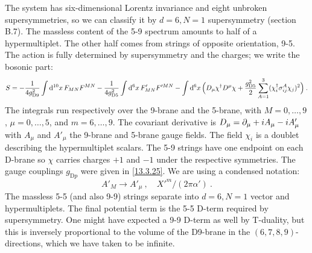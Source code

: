 The system has six-dimensional Lorentz invariance and eight unbroken supersymmetries, so we can classify it by $d = 6, N = 1$ supersymmetry (section B.7). The massless content of the 5-9 spectrum amounts to half of a hypermultiplet. The other half comes from strings of opposite orientation, 9-5. The action is fully determined by supersymmetry and the charges; we write the bosonic part:
\begin{equation}
	S = -\frac{1}{4g_{\mathrm{D}9}^2}\int \mathrm{d}^{10}x\,F_{MN}F^{MN} - \frac{1}{4g_{\mathrm{D}5}^2}\int \mathrm{d}^6 x\,F'_{MN}F'^{MN} - \int \mathrm{d}^6 x\,\Bigl(D_\mu\chi^\dagger D^\mu\chi + \frac{g_{\mathrm{D}5}^2}{2}\sum_{A=1}^3(\chi_i^\dagger\sigma_{ij}^A\chi_j)^2\Bigr) \:. \label{13.5.21}
\end{equation}
The integrals run respectively over the 9-brane and the 5-brane, with $M = 0,\dots,9$, $\mu = 0,\dots,5$, and $m = 6,\dots,9$. The covariant derivative is $D_\mu = \partial_\mu + i A_\mu - i A'_\mu$ with $A_\mu$ and $A'_\mu$ the 9-brane and 5-brane gauge fields. The field $\chi_i$ is a doublet describing the hypermultiplet scalars. The 5-9 strings have one endpoint on each D-brane so $\chi$ carries charges $+1$ and $-1$ under the respective symmetries. The gauge couplings $g_{\mathrm{D}p}$ were given in \eqref{13.3.25}. We are using a condensed notation:
\begin{equation}
	A'_M \longrightarrow A'_\mu \:, \quad X'^m/(2\pi\alpha') \:. \label{13.5.22}
\end{equation}
The massless 5-5 (and also 9-9) strings separate into $d = 6, N = 1$ vector and hypermultiplets. The final potential term is the 5-5 D-term required by supersymmetry. One might have expected a 9-9 D-term as well by T-duality, but this is inversely proportional to the volume of the D9-brane in the $(6,7,8,9)$-directions, which we have taken to be infinite.

